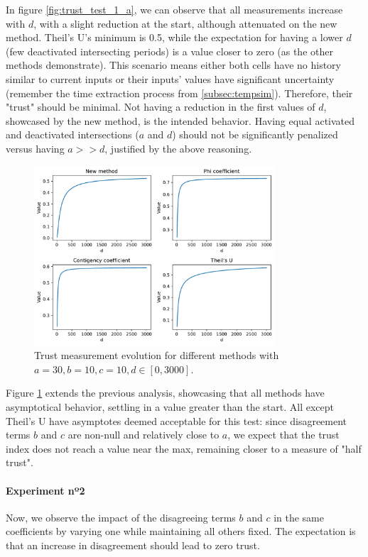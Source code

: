 In figure \ref{fig:trust_test_1_a}, we can observe that all measurements increase with $d$, with a slight reduction at the start, although attenuated on the new method. Theil's U's minimum is 0.5, while the expectation for having a lower $d$ (few deactivated intersecting periods) is a value closer to zero (as the other methods demonstrate). This scenario means either both cells have no history similar to current inputs or their inputs' values have significant uncertainty (remember the time extraction process from \ref{subsec:tempsim}). Therefore, their "trust" should be minimal.
Not having a reduction in the first values of $d$, showcased by the new method, is the intended behavior. Having equal activated and deactivated intersections ($a$ and $d$) should not be significantly penalized versus having $a>>d$, justified by the above reasoning.

\begin{figure}[h!]
\centering
    \includegraphics[width=0.8\textwidth]{figures/chapter4/cell/trust_tests/1_b.pdf}
    \caption{Trust measurement evolution for different methods with $a=30, b=10, c=10, d \in [0, 3000]$.}
    \label{fig:trust_test_1_b}
\end{figure}
\FloatBarrier

Figure \ref{fig:trust_test_1_b} extends the previous analysis, showcasing that all methods have asymptotical behavior, settling in a value greater than the start. All except Theil's U have asymptotes deemed acceptable for this test: since disagreement terms $b$ and $c$ are non-null and relatively close to $a$, we expect that the trust index does not reach a value near the max, remaining closer to a measure of "half trust".

\paragraph{Experiment nº2} Now, we observe the impact of the disagreeing terms $b$ and $c$ in the same coefficients by varying one while maintaining all others fixed. The expectation is that an increase in disagreement should lead to zero trust.

